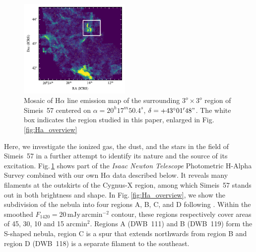 \documentclass{aa}
\begin{document}
\begin{figure}
\includegraphics[width=0.48\textwidth]{Ha_largeregion_image.pdf}
\centering
\caption{Mosaic of H$\alpha$ line emission map of the surrounding
  $3^{o} \times 3^{o}$ region of Simeis~57 centered on
  $\alpha=20^{h}17^m50.4^s$, $\delta=+43^{\circ}01'48"$. The white box
  indicates the region studied in this paper, enlarged in
  Fig.\ref{fig:Ha_overview}}
\label{fig:Ha_mosaic}
\end{figure}

Here, we investigate the ionized gas, the dust, and the stars in the
field of Simeis~57 in a further attempt to identify its nature and the
source of its excitation. Fig.\,\ref{fig:Ha_mosaic} shows part of the
{\it Isaac Newton Telescope} Photometric H-Alpha Survey 
\citep[IPHAS, ][]{iphas1} combined with our own H$\alpha$ data described
below. It reveals many filaments at the outskirts of the Cygnus-X
region, among which Simeis~57 stands out in both brightness and shape.
In Fig.\,\ref{fig:Ha_overview}, we show the subdivision of the nebula
into four regions A, B, C, and D following \cite{israel2003}. Within
the smoothed $F_{1420}=20\,\mathrm{mJy \, arcmin^{-2}}$ contour, these
regions respectively cover areas of 45, 30, 10 and 15
$\mathrm{arcmin}^2$. Regions A (DWB~111) and B (DWB~119) form the
S-shaped nebula, region C is a spur that extends northwards from
region B and region D (DWB~118) is a separate filament to the
southeast.


\end{document}
